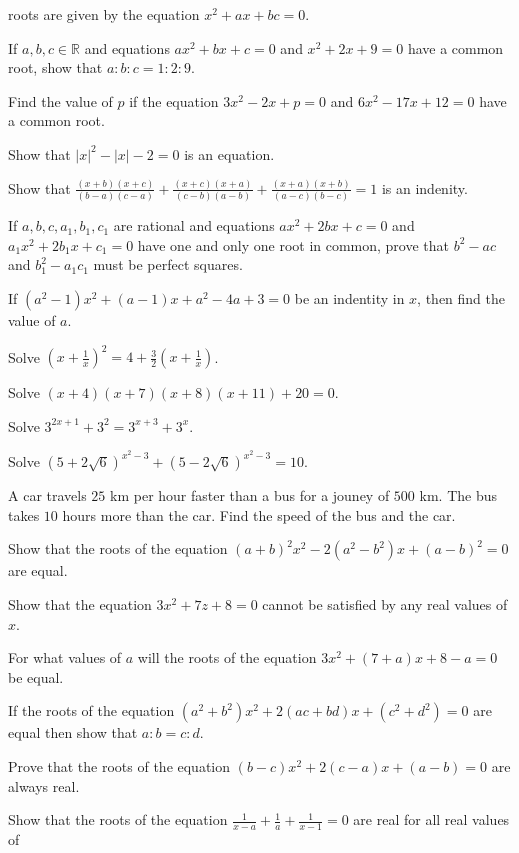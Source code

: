   roots are given by the equation $x^2 + ax + bc = 0$.
\item If $a, b, c\in\mathbb{R}$ and equations $ax^2 + bx + c = 0$ and $x^2 + 2x + 9 = 0$ have a common root, show that $a:b:c =
  1:2:9$.
\item Find the value of $p$ if the equation $3x^2 - 2x + p = 0$ and $6x^2 - 17x + 12 = 0$ have a common root.
\item Show that $|x|^2 - |x| - 2 = 0$ is an equation.
\item Show that $\frac{(x + b)(x + c)}{(b - a)(c - a)} + \frac{(x + c)(x + a)}{(c - b)(a - b)} + \frac{(x + a)(x + b)}{(a - c)(b -
  c)} = 1$ is an indenity.
\item If $a, b, c, a_1, b_1, c_1$ are rational and equations $ax^2 + 2bx + c = 0$ and $a_1x^2 + 2b_1x + c_1 = 0$ have one and only
  one root in common, prove that $b^2 - ac$ and $b_1^2 - a_1c_1$ must be perfect squares.
\item If $(a^2 - 1)x^2 + (a - 1)x + a^2 - 4a + 3 = 0$ be an indentity in $x$, then find the value of $a$.
\item Solve $\left(x + \frac{1}{x}\right)^2 = 4 + \frac{3}{2}\left(x + \frac{1}{x}\right)$.
\item Solve $(x + 4)(x + 7)(x + 8)(x + 11) + 20 = 0$.
\item Solve $3^{2x + 1} + 3^2 = 3^{x + 3} + 3^x$.
\item Solve $(5 + 2\sqrt{6})^{x^2 - 3} + (5 - 2\sqrt{6})^{x^2 - 3} = 10$.
\item A car travels $25$ km per hour faster than a bus for a jouney of $500$ km. The bus takes $10$ hours more than the car. Find
  the speed of the bus and the car.
\item Show that the roots of the equation $(a + b)^2x^2 - 2(a^2 - b^2)x + (a - b)^2 = 0$ are equal.
\item Show that the equation $3x^2 + 7z+ 8 = 0$ cannot be satisfied by any real values of $x$.
\item For what values of $a$ will the roots of the equation $3x^2 + (7 + a)x + 8 - a = 0$ be equal.
\item If the roots of the equation $(a^2 + b^2)x^2 + 2(ac + bd)x + (c^2 + d^2) = 0$ are equal then show that $a:b = c:d$.
\item Prove that the roots of the equation $(b - c)x^2 + 2(c - a)x + (a - b) = 0$ are always real.
\item Show that the roots of the equation $\frac{1}{x - a} + \frac{1}{a} + \frac{1}{x - 1} = 0$ are real for all real values of
